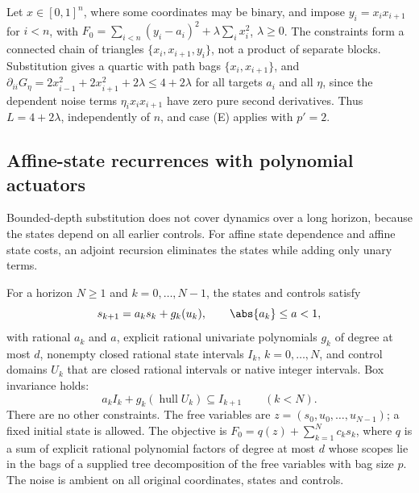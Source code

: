 \begin{example}\label{ex:con:chain}
Let $x\in[0,1]^n$, where some coordinates may be binary, and impose
$y_i=x_ix_{i+1}$ for $i<n$, with
$F_0=\sum_{i<n}(y_i-a_i)^2+\lambda\sum_ix_i^2$, $\lambda\ge0$. The constraints
form a connected chain of triangles $\{x_i,x_{i+1},y_i\}$, not a product of
separate blocks. Substitution gives a quartic with path bags
$\{x_i,x_{i+1}\}$, and $\partial_{ii}G_\eta=2x_{i-1}^2+2x_{i+1}^2+2\lambda\le
4+2\lambda$ for all targets $a_i$ and all $\eta$, since the dependent noise
terms $\eta_ix_ix_{i+1}$ have zero pure second derivatives. Thus
$L=4+2\lambda$, independently of $n$, and case (E) applies with $p'=2$.
\end{example}

\subsection{Affine-state recurrences with polynomial actuators}\label{sec:con:actuator}

Bounded-depth substitution does not cover dynamics over a long horizon,
because the states depend on all earlier controls. For affine state
dependence and affine state costs, an adjoint recursion eliminates the
states while adding only unary terms.

\begin{definition}\label{def:con:actuator}
For a horizon $N\ge1$ and $k=0,\dots,N-1$, the states and controls satisfy
\begin{equation}\label{eq:con:dyn}
 s_{k+1}=a_ks_k+g_k(u_k),\qquad\abs{a_k}\le a<1,
\end{equation}
with rational $a_k$ and $a$, explicit rational univariate polynomials $g_k$
of degree at most $d$, nonempty closed rational state intervals $I_k$,
$k=0,\dots,N$, and control domains $U_k$ that are closed rational intervals
or native integer intervals. Box invariance holds:
\begin{equation}\label{eq:con:invariant}
 a_kI_k+g_k(\operatorname{hull}U_k)\subseteq I_{k+1}\qquad(k<N).
\end{equation}
There are no other constraints. The free variables are
$z=(s_0,u_0,\dots,u_{N-1})$; a fixed initial state is allowed. The objective
is $F_0=q(z)+\sum_{k=1}^Nc_ks_k$, where $q$ is a sum of explicit rational
polynomial factors of degree at most $d$ whose scopes lie in the bags of a
supplied tree decomposition of the free variables with bag size $p$. The
noise is ambient on all original coordinates, states and controls.
\end{definition}

